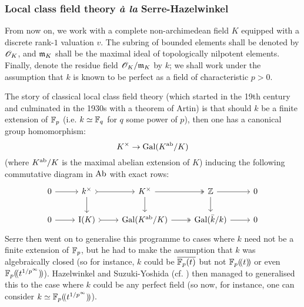             \subsubsection{Local class field theory \textit{\`a la} Serre-Hazelwinkel}
                \begin{convention}
                    From now on, we work with a complete non-archimedean field $K$ equipped with a discrete rank-$1$ valuation $v$. The subring of bounded elements shall be denoted by $\mathscr{O}_K$, and $\mathfrak{m}_K$ shall be the maximal ideal of topologically nilpotent elements. Finally, denote the residue field $\mathscr{O}_K/\mathfrak{m}_K$ by $k$; we shall work under the assumption that $k$ is known to be perfect as a field of characteristic $p > 0$.
                \end{convention}
                
                The story of classical local class field theory (which started in the 19th century and culminated in the 1930s with a theorem of Artin) is that should $k$ be a finite extension of $\mathbb{F}_p$ (i.e. $k \simeq \mathbb{F}_q$ for $q$ some power of $p$), then one has a canonical group homomorphism:
                    $$K^{\x} \to \Gal(K^{\ab}/K)$$
                (where $K^{\mathrm{ab}}/K$ is the maximal abelian extension of $K$) inducing the following commutative diagram in $\mathrm{Ab}$ with exact rows:
                    $$
                        \begin{tikzcd}
                        	0 & {k^{\x}} & {K^{\x}} & \Z & 0 \\
                        	0 & {\rmI(K)} & {\Gal(K^{\ab}/K)} & {\Gal(\bar{k}/k)} & 0
                        	\arrow[from=1-1, to=1-2]
                        	\arrow[tail, from=1-2, to=1-3]
                        	\arrow[two heads, from=1-3, to=1-4]
                        	\arrow[from=1-4, to=1-5]
                        	\arrow[from=2-1, to=2-2]
                        	\arrow[tail, from=2-2, to=2-3]
                        	\arrow[two heads, from=2-3, to=2-4]
                        	\arrow[from=2-4, to=2-5]
                        	\arrow[from=1-2, to=2-2]
                        	\arrow[from=1-3, to=2-3]
                        	\arrow[from=1-4, to=2-4]
                        \end{tikzcd}
                    $$
                Serre then went on to generalise this programme to cases where $k$ need not be a finite extension of $\mathbb{F}_p$, but he had to make the assumption that $k$ was algebraically closed (so for instance, $k$ could be $\overline{\mathbb{F}_p(t)}$ but not $\mathbb{F}_p(\!(t)\!)$ or even $\mathbb{F}_p(\!(t^{1/p^{\infty}})\!)$). Hazelwinkel and Suzuki-Yoshida (cf. \cite{suzuki_yoshida_lcft_refinement}) then managed to generalised this to the case where $k$ could be any perfect field (so now, for instance, one can consider $k \simeq \mathbb{F}_p(\!(t^{1/p^{\infty}})\!)$).
            
